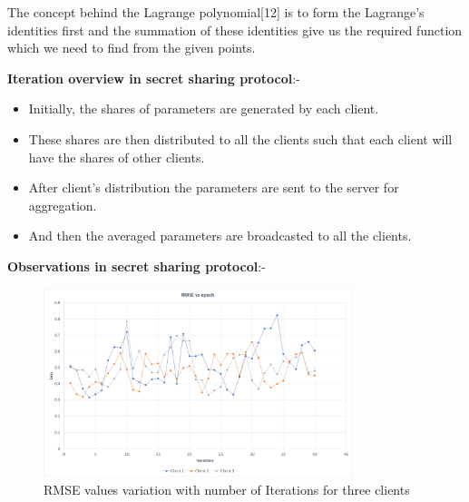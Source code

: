 \documentclass[conference]{IEEEtran}
\begin{document}
The concept behind the Lagrange polynomial[12] is to form the Lagrange’s identities first and the summation of these identities give us the required function which we need to find from the given points. 

\vspace{\baselineskip}

\textbf{Iteration overview in secret sharing protocol}:-

\begin{itemize}

\item Initially, the shares of parameters are generated by each client.

\vspace{\baselineskip}

\item These shares are then distributed to all the clients such that each client will have the shares of other clients. 

\vspace{\baselineskip}

\item After client's distribution the parameters are sent to the server for aggregation.


\vspace{\baselineskip}

\item And then the averaged parameters are broadcasted to all the clients.

\end{itemize}

\vspace{\baselineskip}

\textbf{Observations in secret sharing protocol}:-

\vspace{\baselineskip}
\begin{figure}
\includegraphics[width=90mm,scale=0.7]{RMSE_Secret_Sharing.png}

\caption{ RMSE  values  variation  with  number  of  Iterations for three clients}
\end{figure}
\end{document}
